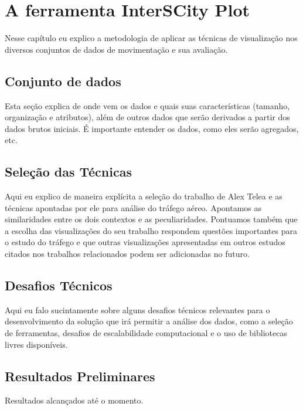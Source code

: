 \chapter{A ferramenta InterSCity Plot}
\label{cap:visualizacao}

Nesse capítulo eu explico a metodologia de aplicar as técnicas de visualização
nos diversos conjuntos de dados de movimentação e sua avaliação.

\section{Conjunto de dados}

Esta seção explica de onde vem os dados e quais suas características (tamanho,
organização e atributos), além de outros dados que serão derivados a partir dos
dados brutos iniciais. É importante entender os dados, como eles serão
agregados, etc.

\section{Seleção das Técnicas}

Aqui eu explico de maneira explícita a seleção do trabalho de Alex Telea e as
técnicas apontadas por ele para análise do tráfego aéreo. Apontamos as
similaridades entre os dois contextos e as peculiaridades. Pontuamos também que
a escolha das visualizações do seu trabalho respondem questões importantes para
o estudo do tráfego e que outras visualizações apresentadas em outros estudos
citados nos trabalhos relacionados podem ser adicionadas no futuro.

\section{Desafios Técnicos}

Aqui eu falo sucintamente sobre alguns desafios técnicos relevantes para o
desenvolvimento da solução que irá permitir a análise dos dados, como a seleção
de ferramentas, desafios de escalabilidade computacional e o uso de bibliotecas
livres disponíveis.

\section{Resultados Preliminares}

Resultados alcançados até o momento.

